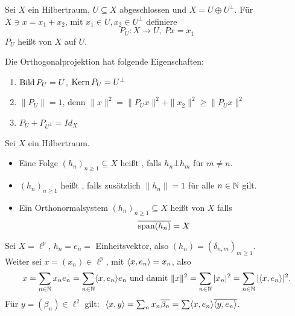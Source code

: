 \begin{definition*}
	Sei $X$ ein Hilbertraum, $U \subseteq X$ abgeschlossen und $X = U \oplus U^{\bot}$. Für $X \ni x = x_{1} + x_{2}$, mit $x_{1} \in U, x_{2} \in U^{\bot}$ definiere
		\[ P_{U} \colon X \rightarrow U, ~ P x = x_{1} \]
		$P_{U}$ hei{\ss}t  von $X$ auf $U$.	
\end{definition*}


\begin{folgerung} \label{folg-16.4}
	Die Orthogonalprojektion hat folgende Eigenschaften:
	\begin{enumerate}[label=\alph*\upshape)]
		\item $\mathop{\rm Bild}\nolimits P_{U} = U$, $\mathop{\rm Kern}\nolimits P_{U} = U^{\bot}$
		\item $\| P_{U} \| = 1$, denn $\| x \|^{2} = \| P_{U} x \|^{2} + \| x_{2} \|^{2} \geq \| P_{U} x \|^{2}$
		\item $P_{U} + P_{U^{\bot}} = Id_{X}$
	\end{enumerate}	
\end{folgerung}


\begin{definition}
	Sei $X$ ein Hilbertraum.
	\begin{itemize}
		\item Eine Folge $(h_{n})_{n \geq 1} \subseteq X$ hei{\ss}t , falls $h_{n} \bot h_{m}$ für $m \neq n$.
		\item $(h_{n})_{n \geq 1}$ hei{\ss}t , falls zusätzlich $\| h_{n} \| = 1$ für alle $n \in \mathbb{N}$ gilt.
		\item Ein Orthonormalsystem $(h_{n})_{n \geq 1} \subseteq X$ hei{\ss}t  von $X$ falls \[ \overline{\operatorname{span}(h_{n})} = X \]
	\end{itemize}
\end{definition}


\begin{beispiel}
	Sei $X = \ell^{p}$, $h_{n} = e_{n} =$ Einheitsvektor, also $(h_{n}) = ( \delta_{n, m} )_{m \geq 1}$. \\
	Weiter sei $x = (x_{n}) \in \ell^{p}$, mit $\langle x , e_{n} \rangle = x_{n}$, also 
	\[ x = \sum_{n \in \mathbb{N}} x_{n} e_{n} = \sum_{n \in \mathbb{N}} \langle x , e_{n} \rangle e_{n} \text{ und damit } \| x \|^{2} = \sum_{n \in \mathbb{N}} |x_{n}|^{2} = \sum_{n \in \mathbb{N}} | \langle x , e_{n} \rangle |^{2}. \]
	Für $y = (\beta_{n}) \in \ell^{2}$ gilt: $ $ $\langle x , y \rangle = \sum_{n} x_{n} \overline{\beta_{n}} = \sum \langle x , e_{n} \rangle \overline{ \langle y , e_{n} \rangle }$.
\end{beispiel}


